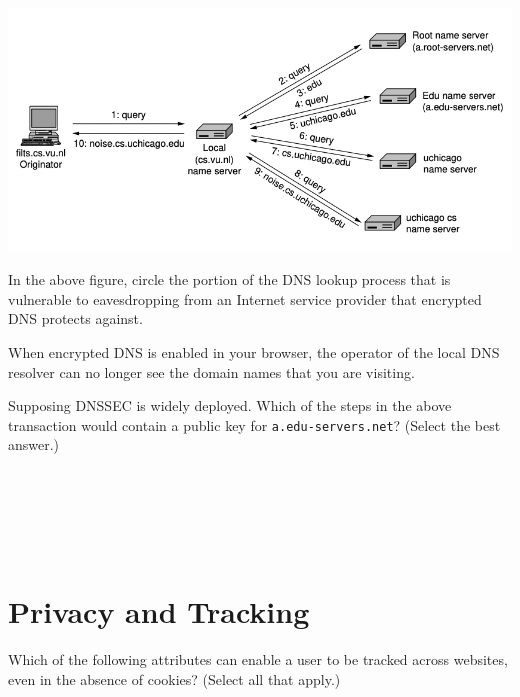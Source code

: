 \begin{center}
\includegraphics[width=0.75\linewidth]{dns}
\end{center}

In the above figure, circle the portion of the DNS lookup process that is
vulnerable to eavesdropping from an Internet service provider that encrypted
DNS protects against.
\eprob

When encrypted DNS is enabled in your browser, the operator of the local DNS
resolver can no longer see the domain names that you are visiting.\\
\yesnono
\eprob

\pagebreak
{}
Supposing DNSSEC is widely deployed. Which of the steps in the above
transaction would contain a public key for {\tt a.edu-servers.net}? (Select
the best answer.)\\
\\
\\
\\
\\
\\
\eprob

\section*{Privacy and Tracking}

Which of the following attributes can enable a user to be tracked across
websites, even in the absence of cookies? (Select all that apply.)\\
\\
\\
\\
\\
\\
\eprob

